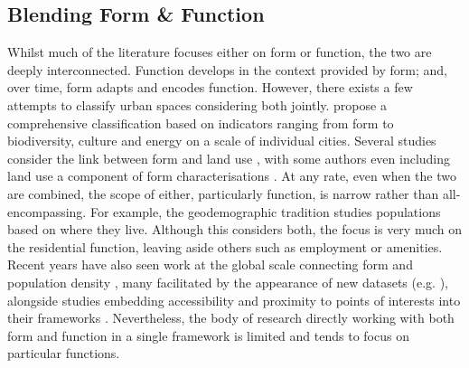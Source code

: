 \subsection{Blending Form \& Function}
\label{sec:lit_gaps}

Whilst much of the literature focuses either on form or function, the two
are deeply interconnected. Function develops in the context provided by
form; and, over time, form adapts and encodes function.
%
However, there exists a few attempts to classify urban spaces considering
both jointly. \cite{bourdic2012} propose a comprehensive
classification based on indicators ranging from form to biodiversity, culture and energy on a scale of individual cities.
%
Several studies consider the link between form and land use
\citep{song2007,song2013,bourdic2012}, with some authors even including land
use a component of form characterisations \citep{dibble2019origin}.
At any rate, even when the two are combined, the scope of either,
particularly function, is narrow rather than all-encompassing.
%
For example, the geodemographic tradition
\citep{harris2005,webber2018} studies populations based on where they live.
Although this considers both, the focus is very much on the residential
function, leaving aside others such as employment or amenities.
%
Recent years have also seen work at the global scale connecting form and
population density
\citep{ewing2002measuring,zheng2014urban,oecd2018rethinking}, many facilitated
by the appearance of new datasets (e.g.
\citealp{pesaresi2019ghs,sorichetta2015}), alongside studies embedding
accessibility and proximity to points of interests into their frameworks
\citep{alexiou2016a,venerandi2019machine}.
%
Nevertheless, the
body of research directly working with both form and function in a single
framework is limited and tends to focus on particular functions.

